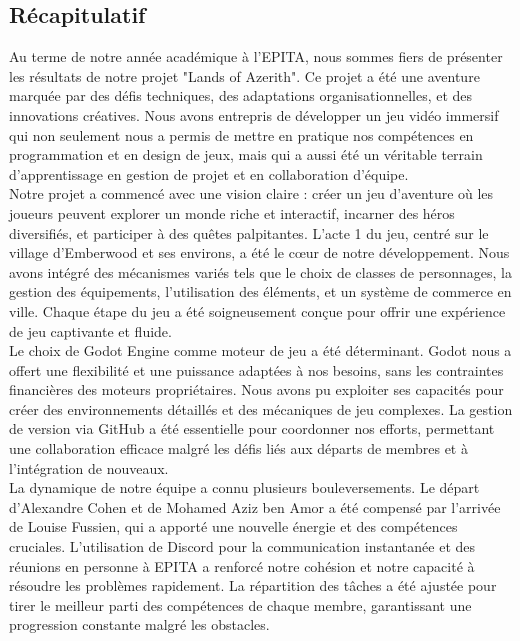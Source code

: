 

\subsection{Récapitulatif}

Au terme de notre année académique à l'EPITA, nous sommes fiers de présenter les résultats de notre projet "Lands of Azerith".
Ce projet a été une aventure marquée par des défis techniques, des adaptations organisationnelles, et des innovations créatives.
Nous avons entrepris de développer un jeu vidéo immersif qui non seulement nous a permis de mettre en pratique nos compétences en programmation et en design de jeux,
mais qui a aussi été un véritable terrain d'apprentissage en gestion de projet et en collaboration d'équipe.
\\

Notre projet a commencé avec une vision claire : créer un jeu d'aventure où les joueurs peuvent explorer un monde riche et interactif,
incarner des héros diversifiés, et participer à des quêtes palpitantes. L'acte 1 du jeu, centré sur le village d'Emberwood et ses environs,
a été le cœur de notre développement. Nous avons intégré des mécanismes variés tels que le choix de classes de personnages, la gestion des équipements,
l'utilisation des éléments, et un système de commerce en ville. Chaque étape du jeu a été soigneusement conçue pour offrir une expérience de jeu captivante et fluide.
\\

Le choix de Godot Engine comme moteur de jeu a été déterminant. Godot nous a offert une flexibilité et une puissance adaptées à nos besoins,
sans les contraintes financières des moteurs propriétaires. Nous avons pu exploiter ses capacités pour créer des environnements détaillés et
des mécaniques de jeu complexes. La gestion de version via GitHub a été essentielle pour coordonner nos efforts, permettant une collaboration
efficace malgré les défis liés aux départs de membres et à l'intégration de nouveaux.
\\

La dynamique de notre équipe a connu plusieurs bouleversements.
Le départ d'Alexandre Cohen et de Mohamed Aziz ben Amor a été compensé par l'arrivée de Louise Fussien, qui a apporté une nouvelle énergie et des compétences cruciales. L'utilisation de Discord pour la communication instantanée et des réunions en personne à EPITA a renforcé notre cohésion et notre capacité à résoudre les problèmes rapidement.
La répartition des tâches a été ajustée pour tirer le meilleur parti des compétences de chaque membre, garantissant une progression constante malgré les obstacles.
\\

